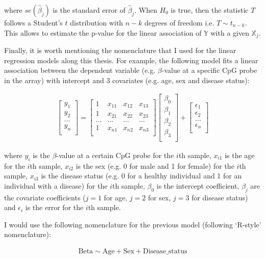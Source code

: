 where $se(\hat{\beta}_j)$ is the standard error of $\hat{\beta}_j$. When $H_0$ is true, then the statistic $T$ follows a Student's $t$ distribution with $n-k$ degrees of freedom i.e. $T\sim t_{n-k}$. This allows to estimate the p-value for the linear association of $\mathbb Y$ with a given $\mathbb X_j$.

\bigskip

Finally, it is worth mentioning the nomenclature that I used for the linear regression models along this thesis. For example, the following model fits a linear association between the dependent variable (e.g. $\beta$-value at a specific CpG probe in the array) with intercept and 3 covariates (e.g. age, sex and disease status):

\begin{align}
\begin{bmatrix}
y_{1} \\
y_{2} \\
... \\
y_{n} \\
\end{bmatrix}
=
\begin{bmatrix}
1 & x_{11}  & x_{12} & x_{13} \\
1 & x_{21} & x_{22} & x_{23} \\
... & ... & ... & ... \\
1& x_{n1} & x_{n2} & x_{n3}  \\
\end{bmatrix}
%
\begin{bmatrix}
\beta_{0} \\
\beta_{1} \\
\beta_{2} \\
\beta_{3} \\
\end{bmatrix}
+
\begin{bmatrix}
\epsilon_{1} \\
\epsilon_{2} \\
... \\
\epsilon_{n} \\
\end{bmatrix}
\end{align}

where $y_i$ is the $\beta$-value at a certain CpG probe for the $i$th sample, $x_{i1}$ is the age for the $i$th sample, $x_{i2}$ is the sex (e.g. 0 for male and 1 for female) for the $i$th sample, $x_{i3}$ is the disease status (e.g. 0 for a healthy individual and 1 for an individual with a disease) for the $i$th sample, $\beta_0$ is the intercept coefficient, $\beta_j$ are the covariate coefficients ($j=1$ for age, $j=2$ for sex, $j=3$ for disease status) and $\epsilon_i$ is the error for the $i$th sample. 

\bigskip

I would use the following nomenclature for the previous model (following `R-style' nomenclature):

\begin{align}
\text{Beta} \sim \text{Age}+\text{Sex}+\text{Disease\_status}
\end{align}



